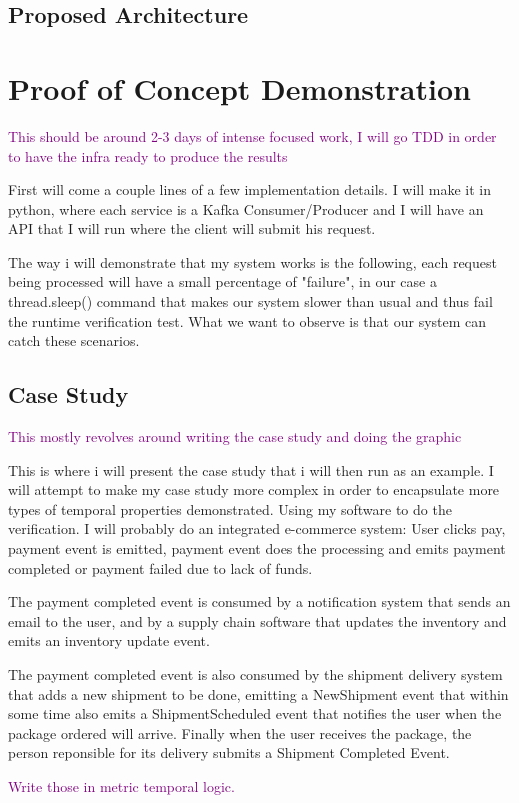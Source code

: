 \documentclass{article}
\newcommand{\note}[1] {
	\textcolor{Purple}{#1}

}
\begin{document}
\subsection{Proposed Architecture}
\section{Proof of Concept Demonstration}
\note{This should be around 2-3 days of intense focused work, I will go TDD in order to have the infra ready to produce the results}
First will come a couple lines of a few implementation details. I will make it in python, where each service is a Kafka Consumer/Producer and I will have an API that I will run where the client will submit his request.

The way i will demonstrate that my system works is the following, each request being processed will have a small percentage of "failure", in our case a thread.sleep() command that makes our system slower than usual and thus fail the runtime verification test. What we want to observe is that our system can catch these scenarios.
\subsection{Case Study}
\note{This mostly revolves around writing the case study and doing the graphic}
This is where i will present the case study that i will then run as an example.
I will attempt to make my case study more complex in order to encapsulate more types of temporal properties demonstrated.
Using my software to do the verification. I will probably do an integrated e-commerce system: User clicks pay, payment event is emitted, payment event does the processing and emits payment completed or payment failed due to lack of funds.

The payment completed event is consumed by a notification system that sends an email to the user, and by a supply chain software that updates the inventory and emits an inventory update event.

The payment completed event is also consumed by the shipment delivery system that adds a new shipment to be done, emitting a NewShipment event that within some time also emits a ShipmentScheduled event that notifies the user when the package ordered will arrive. Finally when the user receives the package, the person reponsible for its delivery submits a Shipment Completed Event.


\note{Write those in metric temporal logic.}
\end{document}
